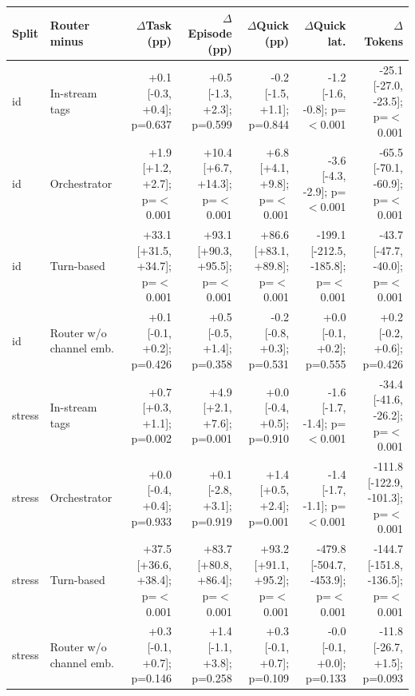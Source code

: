 \begin{tabular}{llrrrrr}
\toprule
Split & Router minus & $\Delta$Task (pp) & $\Delta$Episode (pp) & $\Delta$Quick (pp) & $\Delta$Quick lat. & $\Delta$Tokens \\
\midrule
id & In-stream tags & +0.1 {\scriptsize[-0.3, +0.4]; p=0.637} & +0.5 {\scriptsize[-1.3, +2.3]; p=0.599} & -0.2 {\scriptsize[-1.5, +1.1]; p=0.844} & -1.2 {\scriptsize[-1.6, -0.8]; p=$<$0.001} & -25.1 {\scriptsize[-27.0, -23.5]; p=$<$0.001} \\
id & Orchestrator & +1.9 {\scriptsize[+1.2, +2.7]; p=$<$0.001} & +10.4 {\scriptsize[+6.7, +14.3]; p=$<$0.001} & +6.8 {\scriptsize[+4.1, +9.8]; p=$<$0.001} & -3.6 {\scriptsize[-4.3, -2.9]; p=$<$0.001} & -65.5 {\scriptsize[-70.1, -60.9]; p=$<$0.001} \\
id & Turn-based & +33.1 {\scriptsize[+31.5, +34.7]; p=$<$0.001} & +93.1 {\scriptsize[+90.3, +95.5]; p=$<$0.001} & +86.6 {\scriptsize[+83.1, +89.8]; p=$<$0.001} & -199.1 {\scriptsize[-212.5, -185.8]; p=$<$0.001} & -43.7 {\scriptsize[-47.7, -40.0]; p=$<$0.001} \\
id & Router w/o channel emb. & +0.1 {\scriptsize[-0.1, +0.2]; p=0.426} & +0.5 {\scriptsize[-0.5, +1.4]; p=0.358} & -0.2 {\scriptsize[-0.8, +0.3]; p=0.531} & +0.0 {\scriptsize[-0.1, +0.2]; p=0.555} & +0.2 {\scriptsize[-0.2, +0.6]; p=0.426} \\
stress & In-stream tags & +0.7 {\scriptsize[+0.3, +1.1]; p=0.002} & +4.9 {\scriptsize[+2.1, +7.6]; p=0.001} & +0.0 {\scriptsize[-0.4, +0.5]; p=0.910} & -1.6 {\scriptsize[-1.7, -1.4]; p=$<$0.001} & -34.4 {\scriptsize[-41.6, -26.2]; p=$<$0.001} \\
stress & Orchestrator & +0.0 {\scriptsize[-0.4, +0.4]; p=0.933} & +0.1 {\scriptsize[-2.8, +3.1]; p=0.919} & +1.4 {\scriptsize[+0.5, +2.4]; p=0.001} & -1.4 {\scriptsize[-1.7, -1.1]; p=$<$0.001} & -111.8 {\scriptsize[-122.9, -101.3]; p=$<$0.001} \\
stress & Turn-based & +37.5 {\scriptsize[+36.6, +38.4]; p=$<$0.001} & +83.7 {\scriptsize[+80.8, +86.4]; p=$<$0.001} & +93.2 {\scriptsize[+91.1, +95.2]; p=$<$0.001} & -479.8 {\scriptsize[-504.7, -453.9]; p=$<$0.001} & -144.7 {\scriptsize[-151.8, -136.5]; p=$<$0.001} \\
stress & Router w/o channel emb. & +0.3 {\scriptsize[-0.1, +0.7]; p=0.146} & +1.4 {\scriptsize[-1.1, +3.8]; p=0.258} & +0.3 {\scriptsize[-0.1, +0.7]; p=0.109} & -0.0 {\scriptsize[-0.1, +0.0]; p=0.133} & -11.8 {\scriptsize[-26.7, +1.5]; p=0.093} \\
\bottomrule
\end{tabular}
